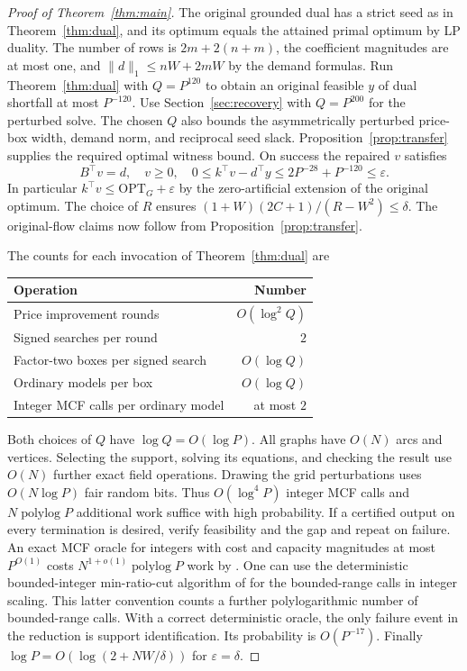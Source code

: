 \documentclass[11pt,letterpaper]{article}
\begin{document}
\begin{proof}[Proof of Theorem~\ref{thm:main}]
The original grounded dual has a strict seed as in Theorem~\ref{thm:dual},
and its optimum equals the attained primal optimum by LP duality.
The number of rows is $2m+2(n+m)$, the coefficient magnitudes are at most
one, and $\|d\|_1\le nW+2mW$ by the demand formulas. Run
Theorem~\ref{thm:dual} with $Q=P^{120}$ to obtain an original feasible
$y$ of dual shortfall at most $P^{-120}$. Use Section~\ref{sec:recovery}
with $Q=P^{200}$ for the perturbed solve. The chosen $Q$ also bounds
the asymmetrically perturbed price-box width, demand norm, and reciprocal
seed slack. Proposition~\ref{prop:transfer} supplies the required optimal
witness bound. On success the repaired $v$ satisfies
\[
  B^\top v=d,\quad v\ge0,\quad
  0\le k^\top v-d^\top y\le 2P^{-28}+P^{-120}\le\varepsilon .
\]
In particular $k^\top v\le\mathrm{OPT}_G+\varepsilon$ by the zero-artificial
extension of the original optimum. The choice of $R$ ensures
$(1+W)(2C+1)/(R-W^2)\le\delta$. The original-flow claims now follow
from Proposition~\ref{prop:transfer}.

The counts for each invocation of Theorem~\ref{thm:dual} are
\begin{center}
\begin{tabular}{@{}lr@{}}
\toprule
Operation & Number \\
\midrule
Price improvement rounds & $O(\log^2 Q)$ \\
Signed searches per round & $2$ \\
Factor-two boxes per signed search & $O(\log Q)$ \\
Ordinary models per box & $O(\log Q)$ \\
Integer MCF calls per ordinary model & at most $2$ \\
\bottomrule
\end{tabular}
\end{center}
Both choices of $Q$ have $\log Q=O(\log P)$. All graphs have $O(N)$ arcs
and vertices. Selecting the support, solving its equations, and checking
the result use $O(N)$ further exact field operations. Drawing the grid
perturbations uses $O(N\log P)$ fair random bits. Thus $O(\log^4 P)$
integer MCF calls and $N\operatorname{polylog}P$ additional work suffice
with high probability. If a certified output on every termination is
desired, verify feasibility and the gap and repeat on failure.
An exact MCF oracle for integers with cost and capacity magnitudes at most
$P^{O(1)}$ costs $N^{1+o(1)}\operatorname{polylog} P$ work by
\cite[Theorem~1.1 and Appendix~C]{cklpps}.
One can use the deterministic bounded-integer min-ratio-cut algorithm of
\cite[Theorem~6.17]{dualcut} for the bounded-range calls in integer scaling.
This latter convention counts a further polylogarithmic number of
bounded-range calls. With a correct deterministic oracle, the only
failure event in the reduction is support identification. Its probability
is $O(P^{-17})$. Finally $\log P=O(\log(2+NW/\delta))$ for
$\varepsilon=\delta$.
\end{proof}
\end{document}
